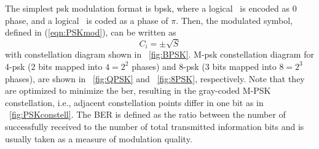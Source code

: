 %
%
The simplest \gls{psk} modulation format is \gls{bpsk}, where a logical \grqq\ is encoded as $0$ phase, and a logical \grqq\ is coded as a phase of $\pi$. Then, the modulated symbol, defined in (\ref{eqn:PSKmod}), can be written as
%
\begin{equation}
\label{eqn:BPSKmod}
C_i=\pm \sqrt{S}
\end{equation}
%
with constellation diagram shown in ~\cref{fig:BPSK}. M-\gls{psk} constellation diagram for 4-\gls{psk} ($2$ bits mapped into $4=2^2$ phases) and 8-\gls{psk} ($3$ bits mapped into $8=2^3$ phases), are shown in ~\cref{fig:QPSK} and ~\cref{fig:8PSK}, respectively. Note that they are optimized to minimize the \gls{ber}, resulting in the gray-coded M-PSK constellation, i.e., adjacent constellation points differ in one bit as in ~\cref{fig:PSKconstell}. The BER is defined as the ratio between the number of successfully received to the number of total transmitted information bits and is usually taken as a measure of modulation quality. 

